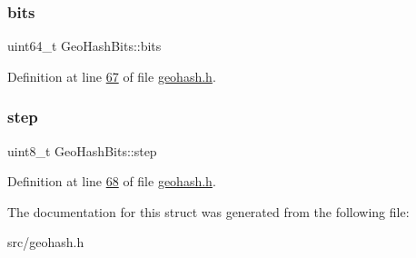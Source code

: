 \subsubsection{\texorpdfstring{bits}{bits}}
{\footnotesize\ttfamily uint64\+\_\+t Geo\+Hash\+Bits\+::bits}



Definition at line \hyperlink{geohash_8h_source_l00067}{67} of file \hyperlink{geohash_8h_source}{geohash.\+h}.

\mbox{\label{structGeoHashBits_aa239ef28dd8d97a7f4eb3c754dce1b90}} 
\subsubsection{\texorpdfstring{step}{step}}
{\footnotesize\ttfamily uint8\+\_\+t Geo\+Hash\+Bits\+::step}



Definition at line \hyperlink{geohash_8h_source_l00068}{68} of file \hyperlink{geohash_8h_source}{geohash.\+h}.



The documentation for this struct was generated from the following file\+:\begin{DoxyCompactItemize}
\item 
src/geohash.\+h\end{DoxyCompactItemize}

